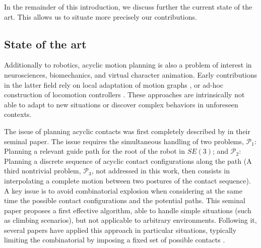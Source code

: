 In the remainder of this introduction, we discuss further the current state of the art. This allows us to situate more precisely our contributions.

\subsection{State of the art}

\newcommand{\Pa}{$\mathcal{P}_1$ }
\newcommand{\Pb}{$\mathcal{P}_2$ }

Additionally to robotics, acyclic motion planning is also a problem of interest in neurosciences, biomechanics, and virtual character animation.
Early contributions in the latter field rely on local adaptation of motion graphs \citep{citeulike:220163}, or ad-hoc construction of locomotion controllers \citep{Pettre:2003:LPD:846276.846313}. These approaches are intrinsically not able to adapt to new situations or discover complex behaviors in unforeseen contexts.

The issue of planning acyclic contacts was first completely described by \citeauthor{Bretl:2006:MPM:1124573.1124585} in their seminal paper. The issue requires the simultaneous handling of two problems, $\mathcal{P}_1$: Planning a relevant guide path for the root of the robot in $SE(3)$; and $\mathcal{P}_2$: Planning a discrete sequence of acyclic contact configurations along the path (A third nontrivial problem, $\mathcal{P}_3$, not addressed in this work, then consists in interpolating a complete motion between two postures of the contact sequence).  A key issue is to avoid combinatorial explosion when considering at the same time the possible contact configurations and the potential paths. This seminal paper proposes a first effective algorithm, able to handle simple situations (such as climbing scenarios), but not applicable to arbitrary environments. Following it, seve\-ral papers have applied this approach in particular situations, typically limiting the combinatorial by imposing a fixed set of possible contacts \citep{Hauser06usingmotion, stilman2010}.

